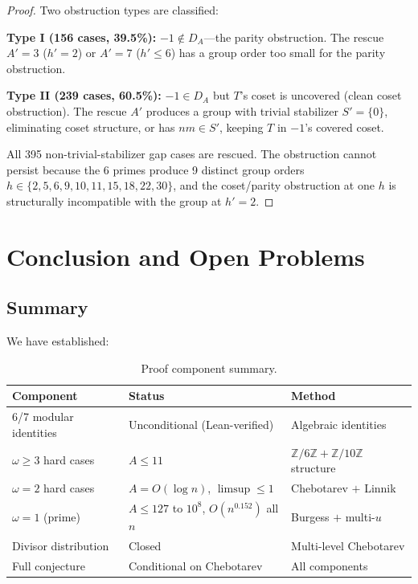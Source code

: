 \documentclass[11pt,a4paper]{article}
\theoremstyle{plain}
\theoremstyle{plain}
\theoremstyle{definition}
\numberwithin{equation}{section}
\begin{document}
\begin{proof}
Two obstruction types are classified:

\textbf{Type I (156 cases, 39.5\%):} $-1 \notin D_A$---the parity obstruction. The rescue $A' = 3$ ($h' = 2$) or $A' = 7$ ($h' \leq 6$) has a group order too small for the parity obstruction.

\textbf{Type II (239 cases, 60.5\%):} $-1 \in D_A$ but $T$'s coset is uncovered (clean coset obstruction). The rescue $A'$ produces a group with trivial stabilizer $S' = \{0\}$, eliminating coset structure, or has $nm \in S'$, keeping $T$ in $-1$'s covered coset.

All 395 non-trivial-stabilizer gap cases are rescued. The obstruction cannot persist because the 6 primes produce 9 distinct group orders $h \in \{2, 5, 6, 9, 10, 11, 15, 18, 22, 30\}$, and the coset/parity obstruction at one $h$ is structurally incompatible with the group at $h' = 2$.
\end{proof}

\section{Conclusion and Open Problems}

\subsection{Summary}

We have established:

\begin{table}[h]
\centering
\begin{tabular}{lll}
\toprule
Component & Status & Method \\
\midrule
6/7 modular identities & Unconditional (Lean-verified) & Algebraic identities \\
$\omega \geq 3$ hard cases & $A \leq 11$ & $\mathbb{Z}/6\mathbb{Z} + \mathbb{Z}/10\mathbb{Z}$ structure \\
$\omega = 2$ hard cases & $A = O(\log n)$, $\limsup \leq 1$ & Chebotarev $+$ Linnik \\
$\omega = 1$ (prime) & $A \leq 127$ to $10^8$, $O(n^{0.152})$ all $n$ & Burgess $+$ multi-$u$ \\
Divisor distribution & Closed & Multi-level Chebotarev \\
Full conjecture & Conditional on Chebotarev & All components \\
\bottomrule
\end{tabular}
\caption{Proof component summary.}
\end{table}
\end{document}
